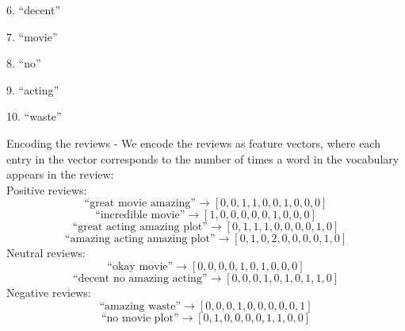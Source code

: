 \documentclass[a3paper,12pt]{extarticle} %
\begin{document}
6. ``decent''

7. ``movie''

8. ``no''

9. ``acting''

10. ``waste''

\[\]
Encoding the reviews - We encode the reviews as feature vectors, where each entry in the vector corresponds to the number of times a word in the vocabulary appears in the review:
\\ Positive reviews:
\[
\text{``great movie amazing''} \rightarrow [0, 0, 1, 1, 0, 0, 1, 0, 0, 0]
\]
\[
\text{``incredible movie''} \rightarrow [1, 0, 0, 0, 0, 0, 1, 0, 0, 0]
\]
\[
\text{``great acting amazing plot''} \rightarrow [0, 1, 1, 1, 0, 0, 0, 0, 1, 0]
\]
\[
\text{``amazing acting amazing plot''} \rightarrow [0, 1, 0, 2, 0, 0, 0, 0, 1, 0]
\]
Neutral reviews:
\[
\text{``okay movie''} \rightarrow [0, 0, 0, 0, 1, 0, 1, 0, 0, 0]
\]
\[
\text{``decent no amazing acting''} \rightarrow [0, 0, 0, 1, 0, 1, 0, 1, 1, 0]
\]
Negative reviews:
\[
\text{``amazing waste''} \rightarrow [0, 0, 0, 1, 0, 0, 0, 0, 0, 1]
\]
\[
\text{``no movie plot''} \rightarrow [0, 1, 0, 0, 0, 0, 1, 1, 0, 0]
\]
\end{document}
